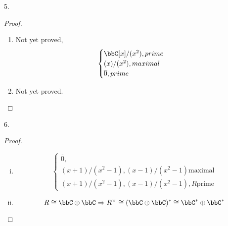 \begin{exercise}
    5.
\end{exercise}

\begin{proof}
    \begin{enumerate}
        \item Not yet proved, $$\begin{cases}
            \bbC [x]/(x^2), prime\\
            (x)/(x^2), maximal\\
            \overline{0}, prime
        \end{cases}$$
        \item Not yet proved.
    \end{enumerate}
\end{proof}

\begin{exercise}
    6.
\end{exercise}

\begin{proof}
    \begin{enumerate}[(i)]
        \item $$\begin{cases}
            \overline{0}, \\
            (x+1)/(x^2-1), (x-1)/(x^2-1) \text{maximal}\\
            (x+1)/(x^2-1), (x-1)/(x^2-1), R \text{prime}
        \end{cases}$$
        \item $$R\cong \bbC \oplus \bbC \Rightarrow R^{\times} \cong (\bbC \oplus \bbC)^* \cong \bbC^* \oplus \bbC^*$$
    \end{enumerate}

\end{proof}
